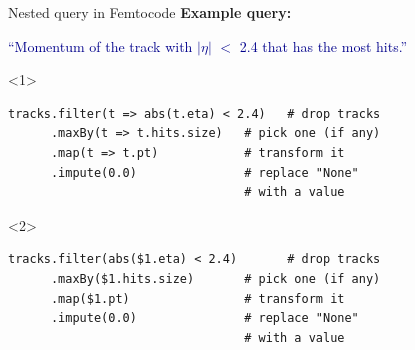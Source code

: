 \documentclass{beamer}
\begin{document}
\begin{frame}[fragile]{Nested query in Femtocode}
\vspace{0.5 cm}
{\bf Example query:}
\begin{center}
\begin{minipage}{0.95\linewidth}
\textcolor{darkblue}{``Momentum of the track with $|\eta|$ $<$ 2.4 that has the most hits.''}
\end{minipage}
\end{center}
\small
\begin{onlyenv}<1>
\begin{verbatim}
tracks.filter(t => abs(t.eta) < 2.4)   # drop tracks
      .maxBy(t => t.hits.size)   # pick one (if any)
      .map(t => t.pt)            # transform it
      .impute(0.0)               # replace "None"
                                 # with a value
\end{verbatim}
\end{onlyenv}
\begin{onlyenv}<2>
\begin{verbatim}
tracks.filter(abs($1.eta) < 2.4)       # drop tracks
      .maxBy($1.hits.size)       # pick one (if any)
      .map($1.pt)                # transform it
      .impute(0.0)               # replace "None"
                                 # with a value
\end{verbatim}
\end{onlyenv}
\end{frame}
\end{document}
